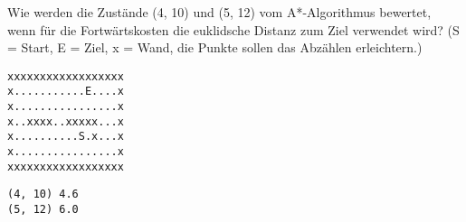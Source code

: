 \question[2]
Wie werden die Zustände (4, 10)  und  (5, 12) vom A*-Algorithmus
bewertet, wenn für die Fortwärtskosten die euklidsche Distanz zum Ziel verwendet
wird? (S = Start, E = Ziel, x = Wand, die Punkte sollen das Abzählen erleichtern.)
\begin{lstlisting}
xxxxxxxxxxxxxxxxxx
x...........E....x
x................x
x..xxxx..xxxxx...x
x..........S.x...x
x................x
xxxxxxxxxxxxxxxxxx
\end{lstlisting}
\begin{solutionbox}{2cm}
\begin{lstlisting}
(4, 10) 4.6
(5, 12) 6.0
\end{lstlisting}
\end{solutionbox}

